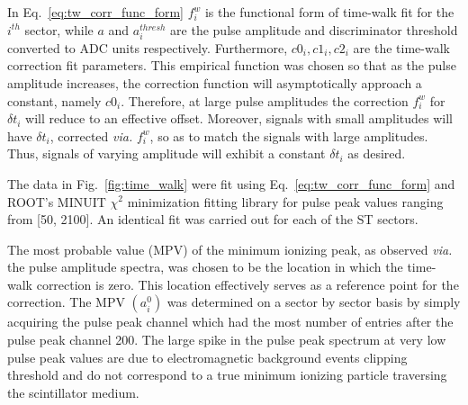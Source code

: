 In Eq.~\ref{eq:tw_corr_func_form} $f^{w}_{i}$ is the functional form of time-walk fit for the $i^{th}$ sector, while $a$ and $a^{thresh}_{i}$ are the pulse amplitude and discriminator threshold converted to ADC units respectively.  Furthermore, $c0_{i}, c1_{i}, c2_{i}$ are the time-walk correction fit parameters.  This empirical function was chosen so that as the pulse amplitude increases, the correction function will asymptotically approach a constant, namely $c0_{i}$.  Therefore, at large pulse amplitudes the correction $f^{w}_{i}$ for $\delta t_{i}$ will reduce to an effective offset.  Moreover, signals with small amplitudes will have $\delta t_{i}$, corrected \textit{via.} $f^{w}_{i}$, so as to match the signals with large amplitudes.  Thus, signals of varying amplitude will exhibit a constant $\delta t_{i}$ as desired.

The data in Fig.~\ref{fig:time_walk} were fit using Eq.~\ref{eq:tw_corr_func_form} and ROOT's MINUIT $\chi^{2}$ minimization fitting library \cite{root_minuit} for pulse peak values ranging from [50, 2100].  An identical fit was carried out for each of the ST sectors.


The most probable value (MPV) of the minimum ionizing peak, as observed \textit{via.} the pulse amplitude spectra, was chosen to be the location in which the time-walk correction is zero.  This location effectively serves as a reference point for the correction.  
The MPV $(a^{0}_{i})$ was determined on a sector by sector basis by simply acquiring the pulse peak channel which had the most number of entries after the pulse peak channel 200.  The large spike in the pulse peak spectrum at very low pulse peak values are due to electromagnetic background events clipping threshold and do not correspond to a true minimum ionizing particle traversing the scintillator medium.

